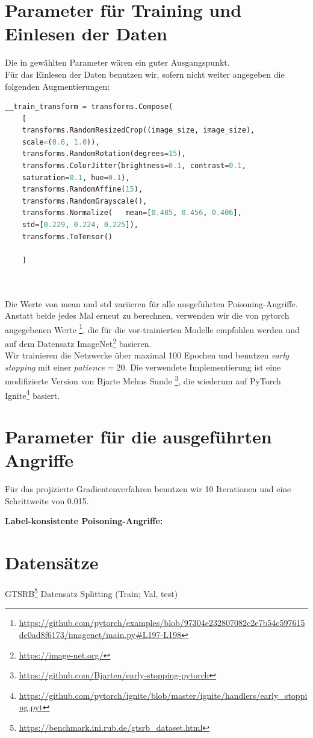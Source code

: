 \documentclass[twoside, 11pt,a4paper]{article}
\numberwithin{equation}{section}
\begin{document}
	\section{Parameter für Training und Einlesen der Daten}\label{param_net}
	Die in \cite{CH} gewählten Parameter wären ein guter Ausgangspunkt.\\
	Für das Einlesen der Daten benutzen wir, sofern nicht weiter angegeben die folgenden Augmentierungen:
	
	\begin{lstlisting}[language=Python, caption=Augemntierung beim Einlesen der Daten]
	__train_transform = transforms.Compose(
	[
	transforms.RandomResizedCrop((image_size, image_size), 
	scale=(0.6, 1.0)),
	transforms.RandomRotation(degrees=15),
	transforms.ColorJitter(brightness=0.1, contrast=0.1, 
	saturation=0.1, hue=0.1),
	transforms.RandomAffine(15),
	transforms.RandomGrayscale(),
	transforms.Normalize(	mean=[0.485, 0.456, 0.406], 
	std=[0.229, 0.224, 0.225]),
	transforms.ToTensor()
	
	]
	
	
	\end{lstlisting}
	Die Werte von mean und std variieren für alle ausgeführten Poisoning-Angriffe. Anstatt beide jedes Mal erneut zu berechnen, verwenden wir die von pytorch angegebenen Werte \footnote{\url{https://github.com/pytorch/examples/blob/97304e232807082c2e7b54c597615dc0ad8f6173/imagenet/main.py\#L197-L198}}, die für die vor-trainierten Modelle empfohlen werden und auf dem Datensatz ImageNet\footnote{\url{https://image-net.org/}} basieren.\\ 
	Wir trainieren die Netzwerke über maximal 100 Epochen und benutzen \textit{early stopping} mit einer $patience=20$. Die verwendete Implementierung ist eine modifizierte Version von Bjarte Mehus Sunde \footnote{\url{https://github.com/Bjarten/early-stopping-pytorch}}, die wiederum auf PyTorch Ignite\footnote{\url{https://github.com/pytorch/ignite/blob/master/ignite/handlers/early\_stopping.pyt}} basiert.\\
	
	\section{Parameter für die ausgeführten Angriffe}\label{param_attacks}
	Für das projizierte Gradientenverfahren benutzen wir 10 Iterationen und eine Schrittweite von 0.015.
	
	\textbf{Label-konsistente Poisoning-Angriffe:}
	\section{Datensätze}
	GTSRB\footnote{\url{https://benchmark.ini.rub.de/gtsrb_dataset.html}}
	Datensatz Splitting (Train; Val, test)
	
\end{document}
